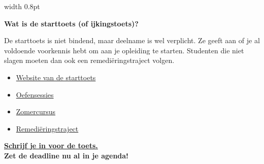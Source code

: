 \documentclass[12pt,a4paper]{article}
\begin{document}
%
\hfill\hfill
{\color{kulaccent}\vrule width 0.8pt}
\hfill\hfill
%
\begin{minipage}[t]{0.46\textwidth}

{\selectfont\bfseries\textcolor{kulaccent}{Wat is de starttoets (of ijkingstoets)?}}

\vspace{0.4em}
De starttoets is niet bindend, maar deelname is wel verplicht. Ze geeft aan of je al voldoende voorkennis hebt om aan je opleiding te starten. Studenten die niet slagen moeten dan ook een remediëringstraject volgen.
\vspace{0.4em}

\begin{itemize}[leftmargin=1.5em, label=\textcolor{kulaccent}{\textbullet}]
    \setlength{\itemsep}{4pt}
    \setlength{\parskip}{0pt}

    \item \href{https://www.kuleuven.be/toekomstigestudenten/voorkennis-en-voorbereiding/starttoets-ijkingstoets}
{Website van de starttoets \scalebox{0.6}{\faLink}}
    
    \item \href{https://med.kuleuven.be/nl/studeren/toekomstigestudenten/oefensessies/index.html}
{Oefensessies \scalebox{0.6}{\faLink}}

    \item \href{https://med.kuleuven.be/nl/studeren/toekomstigestudenten/zomercursus/index.html}
{Zomercursus \scalebox{0.6}{\faLink}}

    \item \href{https://med.kuleuven.be/nl/studeren/toekomstigestudenten/voorbereiding-biomedische-wetenschappen/starttoets#remedi\%C3\%ABring}
{Remediëringstraject \scalebox{0.6}{\faLink}}
    
\end{itemize}

\begin{tcolorbox}[
    colback=kulblue,
    colframe=kulblue,
    boxrule=0pt,
    arc=0pt,
    width=\linewidth,
    left=3mm,
    right=3mm,
    top=3mm,
    bottom=3mm
]

\href{https://www.starttoets-ijkingstoets.be/nl/inschrijven}
{\textbf{Schrijf je in voor de toets.} \scalebox{0.6}{\faLink}} \\ \textbf{Zet de deadline nu al in je agenda!}

\end{tcolorbox}

\end{minipage}
\end{document}
